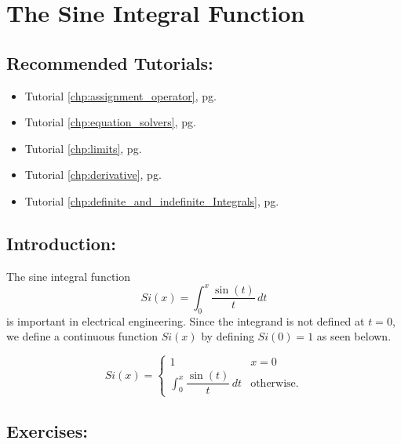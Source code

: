 \section{The Sine Integral Function}
\label{sec:sine_integral_function}	

\subsection*{Recommended Tutorials:}
\begin{itemize}
	\item Tutorial \ref{chp:assignment_operator}, pg. \pageref{chp:assignment_operator}
	\item Tutorial \ref{chp:equation_solvers}, pg. \pageref{chp:equation_solvers}
	\item Tutorial \ref{chp:limits}, pg. \pageref{chp:limits}
	\item Tutorial \ref{chp:derivative}, pg. \pageref{chp:derivative}
	\item Tutorial \ref{chp:definite_and_indefinite_Integrals}, pg. \pageref{chp:definite_and_indefinite_Integrals}
\end{itemize}

\subsection*{Introduction:}

The sine integral function
\[Si(x) = \displaystyle\int_{0}^x \dfrac{\sin(t)}{t}\, dt\]
is important in electrical engineering. Since the integrand is not defined at $t=0$, we define a continuous function $Si(x)$ by defining $Si(0)=1$ as seen belown.

\[Si(x) = \begin{cases} 1 & x = 0\\ \displaystyle\int_{0}^x \dfrac{\sin(t)}{t}\, dt & \text{otherwise.} \end{cases}\]




\subsection*{Exercises:}

